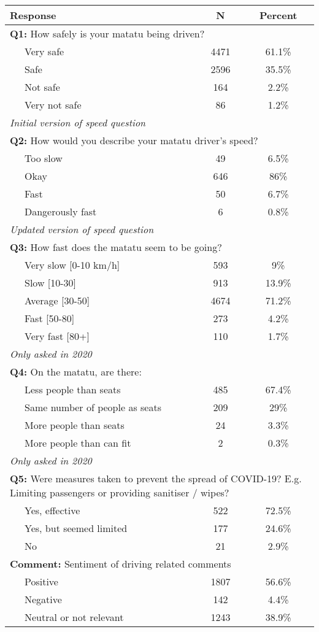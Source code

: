 \begin{tabular}{lcc} 
\hline 
Response & N & Percent \\ 
\hline 
\multicolumn{3}{l}{\textbf{Q1:} How safely is your matatu being driven?} \\ 
~~~Very safe & 4471 & 61.1\% \\ 
 ~~~Safe & 2596 & 35.5\% \\ 
 ~~~Not safe & 164 & 2.2\% \\ 
 ~~~Very not safe & 86 & 1.2\% \\ 
\hline 
\multicolumn{3}{l}{\textit{Initial version of speed question}} \\ 
\multicolumn{3}{l}{\textbf{Q2:} How would you describe your matatu driver's speed?} \\ 
~~~Too slow & 49 & 6.5\% \\ 
 ~~~Okay & 646 & 86\% \\ 
 ~~~Fast & 50 & 6.7\% \\ 
 ~~~Dangerously fast & 6 & 0.8\% \\ 
\hline 
\multicolumn{3}{l}{\textit{Updated version of speed question}} \\ 
\multicolumn{3}{l}{\textbf{Q3:} How fast does the matatu seem to be going?} \\ 
~~~Very slow [0-10 km/h] & 593 & 9\% \\ 
 ~~~Slow [10-30] & 913 & 13.9\% \\ 
 ~~~Average [30-50] & 4674 & 71.2\% \\ 
 ~~~Fast [50-80] & 273 & 4.2\% \\ 
 ~~~Very fast [80+] & 110 & 1.7\% \\ 
\hline 
\multicolumn{3}{l}{\textit{Only asked in 2020}} \\ 
\multicolumn{3}{l}{\textbf{Q4:} On the matatu, are there:} \\ 
~~~Less people than seats & 485 & 67.4\% \\ 
 ~~~Same number of people as seats & 209 & 29\% \\ 
 ~~~More people than seats & 24 & 3.3\% \\ 
 ~~~More people than can fit & 2 & 0.3\% \\ 
\hline 
\multicolumn{3}{l}{\textit{Only asked in 2020}} \\ 
\multicolumn{3}{p{8cm}}{\textbf{Q5:} Were measures taken to prevent the spread of COVID-19? E.g. Limiting passengers or providing sanitiser / wipes?} \\ 
~~~Yes, effective & 522 & 72.5\% \\ 
 ~~~Yes, but seemed limited & 177 & 24.6\% \\ 
 ~~~No & 21 & 2.9\% \\ 
\hline 
\multicolumn{3}{p{8cm}}{\textbf{Comment:} Sentiment of driving related comments} \\ 
~~~Positive & 1807 & 56.6\% \\ 
 ~~~Negative & 142 & 4.4\% \\ 
 ~~~Neutral or not relevant & 1243 & 38.9\% \\ 
\hline 
\end{tabular}